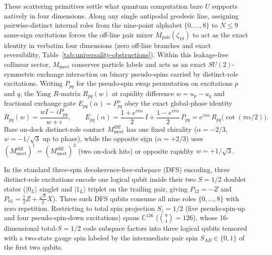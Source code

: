 These scattering primitives settle what quantum computation bare $U$ supports natively in four dimensions. Along any
single antipodal geodesic line, assigning pairwise-distinct internal roles from the nine-point alphabet $\{0, \dots, 8\}$
to $N \le 9$ same-sign excitations forces the off-line pair mixer $M_{\mathrm{pair}}(\zeta_{18})$ to act as the exact
identity in verbatim four dimensions (zero off-line branches and exact reversibility,
Table~\ref{tab:universality-obstructions}). Within this leakage-free collinear sector, $M_{\mathrm{meet}}$ conserves
particle labels and acts as an exact $SU(2)$-symmetric exchange interaction on binary pseudo-spins carried by
distinct-role excitations. Writing $P_{pq}$ for the pseudo-spin swap permutation on excitations $p$ and $q$, the Yang
$R$-matrix $R_{pq}(w)$ at rapidity difference $w = u_p - u_q$ and fractional exchange gate $E_{pq}(\alpha) = P_{pq}^\alpha$
obey the exact global-phase identity
\begin{equation}
R_{pq}(w) = \frac{w I - i P_{pq}}{w + i},
\qquad
E_{pq}(\alpha) = \frac{1 + e^{i\pi\alpha}}{2}\,I + \frac{1 - e^{i\pi\alpha}}{2}\,P_{pq}
= e^{i\pi\alpha}\, R_{pq}\bigl(\cot(\pi\alpha/2)\bigr).
\label{eq:yang-exchange}
\end{equation}
Bare on-dock distinct-role contact $M_{\mathrm{meet}}^{\mathrm{diff}}$ has one fixed chirality ($\alpha = -2/3$,
$w = -1/\sqrt{3}$ up to phase), while the opposite sign ($\alpha = +2/3$) uses $(M_{\mathrm{meet}}^{\mathrm{diff}})^\dagger
= (M_{\mathrm{meet}}^{\mathrm{diff}})^2$ (two on-dock hits) or opposite rapidity $w = +1/\sqrt{3}$.

In the standard three-spin decoherence-free-subspace (DFS) encoding, three distinct-role excitations encode one logical
qubit inside their two $S = 1/2$ doublet states ($|0_L\rangle$ singlet and $|1_L\rangle$ triplet on the trailing pair,
giving $P_{12} = -Z$ and $P_{01} = \frac{1}{2}Z + \frac{\sqrt{3}}{2}X$). Three such DFS qubits consume all nine roles
$\{0, \dots, 8\}$ with zero repetition. Restricting to total spin projection $S_z = 1/2$ (five pseudo-spin-up and four
pseudo-spin-down excitations) spans $\mathbb{C}^{126}$ ($\binom{9}{4} = 126$), whose 16-dimensional total-$S = 1/2$ code
subspace factors into three logical qubits tensored with a two-state gauge spin labeled by the intermediate pair spin
$S_{AB} \in \{0, 1\}$ of the first two qubits.

